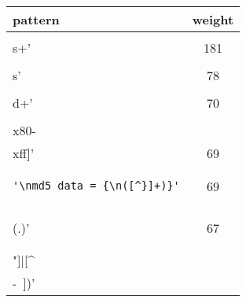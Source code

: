 \begin{table}
\caption{ \label{}}
\begin{center}
\begin{tabular}{lc}
\toprule
pattern & weight \\ 
\midrule
\begin{minipage}{2.3in}
\begin{verbatim}
'\\s+'\end{verbatim}
\end{minipage}
& 181 \\ 
\midrule
\begin{minipage}{2.3in}
\begin{verbatim}
'\\s'\end{verbatim}
\end{minipage}
& 78 \\ 
\midrule
\begin{minipage}{2.3in}
\begin{verbatim}
'\\d+'\end{verbatim}
\end{minipage}
& 70 \\ 
\midrule
\begin{minipage}{2.3in}
\begin{verbatim}
'[\\x80-\\xff]'\end{verbatim}
\end{minipage}
& 69 \\ 
\midrule
\begin{minipage}{2.3in}
\begin{verbatim}
'\nmd5_data = {\n([^}]+)}'\end{verbatim}
\end{minipage}
& 69 \\ 
\midrule
\begin{minipage}{2.3in}
\begin{verbatim}
'\\\\(.)'\end{verbatim}
\end{minipage}
& 67 \\ 
\midrule
\begin{minipage}{2.3in}
\begin{verbatim}
'([\\\\"]|[^\\ -~])'\end{verbatim}

\end{minipage}
\end{tabular}
\end{center}
\end{table}
